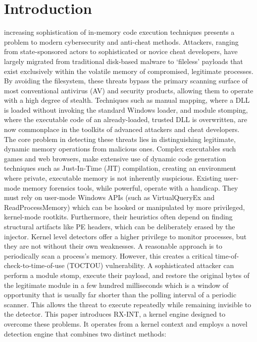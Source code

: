 \documentclass[journal]{IEEEtran}
\begin{document}
\section{Introduction}
 increasing sophistication of in-memory code execution techniques presents a problem to modern cybersecurity and anti-cheat methods. Attackers, ranging from state-sponsored actors to sophisticated or novice cheat developers, have largely migrated from traditional disk-based malware to `fileless' payloads that exist exclusively within the volatile memory of compromised, legitimate processes. By avoiding the filesystem, these threats bypass the primary scanning surface of most conventional antivirus (AV) and security products, allowing them to operate with a high degree of stealth. Techniques such as manual mapping, where a DLL is loaded without invoking the standard Windows loader, and module stomping, where the executable code of an already-loaded, trusted DLL is overwritten, are now commonplace in the toolkits of advanced attackers and cheat developers.
The core problem in detecting these threats lies in distinguishing legitimate, dynamic memory operations from malicious ones. Complex executables such games and web browsers, make extensive use of dynamic code generation techniques such as Just-In-Time (JIT) compilation, creating an environment where private, executable memory is not inherently suspicious. Existing user-mode memory forensics tools, while powerful, operate with a handicap. They must rely on user-mode Windows APIs (such as VirtualQueryEx and ReadProcessMemory) which can be hooked or manipulated by more privileged, kernel-mode rootkits. Furthermore, their heuristics often depend on finding structural artifacts like PE headers, which can be deliberately erased by the injector.
Kernel level detectors offer a higher privilege to monitor processes, but they are not without their own weaknesses. A reasonable approach is to periodically scan a process's memory. However, this creates a critical time-of-check-to-time-of-use (TOCTOU) vulnerability. A sophisticated attacker can perform a module stomp, execute their payload, and restore the original bytes of the legitimate module in a few hundred milliseconds which is a window of opportunity that is usually far shorter than the polling interval of a periodic scanner. This allows the threat to execute repeatedly while remaining invisible to the detector.
This paper introduces RX-INT, a kernel engine designed to overcome these problems. It operates from a kernel context and employs a novel detection engine that combines two distinct methods:
\end{document}
